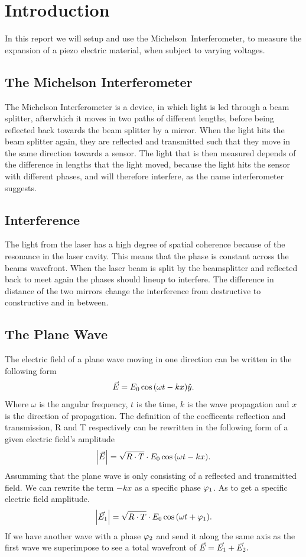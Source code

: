\chapter{Introduction}
In this report we will setup and use the \mbox{Michelson~Interferometer,}
to measure the \mbox{expansion} of a piezo electric material, when subject to varying voltages.
\section{The Michelson Interferometer}
The Michelson Interferometer is a device, in which light is led through a beam splitter, 
afterwhich it moves in two paths of different lengths, before being reflected back towards the beam splitter by a mirror.
When the light hits the beam splitter again, they are reflected and transmitted such that they move in the same direction towards a sensor.
The light that is then measured depends of the difference in lengths that the light moved, because the light hits the sensor with different phases, 
and will therefore interfere, as the name interferometer suggests.
\section{Interference}
The light from the laser has a high degree of spatial coherence because of the resonance in the laser cavity. 
This means that the phase is constant across the beams wavefront. 
When the laser beam is split by the beamsplitter and reflected back to meet again the phases should lineup to interfere. 
The difference in distance of the two mirrors change the interference from destructive to constructive and in between. 
\section{The Plane Wave}
The electric field of a plane wave moving in one direction can be written in the following form
$$\vec{E} = E_{\textup{0}}\cos{\left(\omega t - k x\right)}\hat{y}.$$
Where $\omega$ is the angular frequency, $t$ is the time, $k$ is the wave propagation and $x$ is the direction of propagation.
The definition of the \mbox{coefficents} reflection and transmission, R and T respectively can be rewritten in the following form of a given electric field's amplitude
$$\abs{\vec{E}} = \sqrt{R \cdot T} \cdot E_{\textup{0}}\cos{\left(\omega t - k x\right)}.$$
Assumming that the plane wave is only \mbox{consisting} of a reflected and transmitted field. We can rewrite the term $-kx$ as a specific phase $\varphi_{\textup{1}}$. 
As to get a specific electric field amplitude.
$$\abs{\vec{E_{\textup{1}}}} = \sqrt{R \cdot T} \cdot E_{\textup{0}}\cos{\left(\omega t + \varphi_{\textup{1}}\right)}.$$
If we have another wave with a phase $\varphi_{\textup{2}}$ and send it along the same axis as the first wave we superimpose to see a total wavefront of \mbox{$\vec{E} = \vec{E_{\textup{1}}} + \vec{E_{\textup{2}}}.$}

